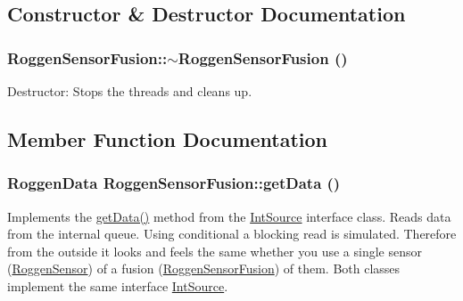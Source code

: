 \subsection{Constructor \& Destructor Documentation}
\hypertarget{classRoggenSensorFusion_a3f31cc50b5c484ab19713f14fb9c8d10}{
\subsubsection[{$\sim$RoggenSensorFusion}]{\setlength{\rightskip}{0pt plus 5cm}RoggenSensorFusion::$\sim$RoggenSensorFusion ()}}
\label{classRoggenSensorFusion_a3f31cc50b5c484ab19713f14fb9c8d10}
Destructor: Stops the threads and cleans up. 

\subsection{Member Function Documentation}
\hypertarget{classRoggenSensorFusion_adbf5ec2917eea50f83ae836213e03c5c}{
\subsubsection[{getData}]{\setlength{\rightskip}{0pt plus 5cm}RoggenData RoggenSensorFusion::getData ()}}
\label{classRoggenSensorFusion_adbf5ec2917eea50f83ae836213e03c5c}
Implements the \hyperlink{classRoggenSensorFusion_adbf5ec2917eea50f83ae836213e03c5c}{getData()} method from the \hyperlink{classIntSource}{IntSource} interface class. Reads data from the internal queue. Using conditional a blocking read is simulated. Therefore from the outside it looks and feels the same whether you use a single sensor (\hyperlink{classRoggenSensor}{RoggenSensor}) of a fusion (\hyperlink{classRoggenSensorFusion}{RoggenSensorFusion}) of them. Both classes implement the same interface \hyperlink{classIntSource}{IntSource}. 

